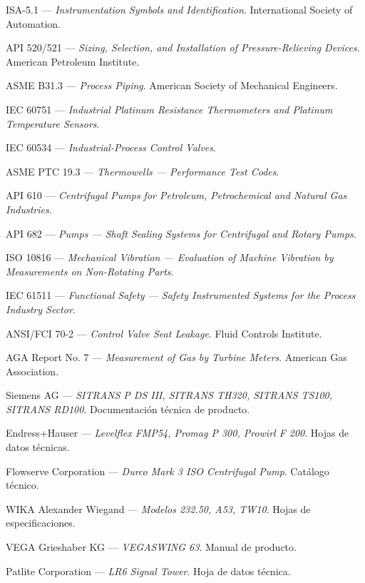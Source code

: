 \documentclass[12pt,letterpaper]{article}
\begin{document}
\begin{enumerate}[leftmargin=1.5cm, label={[\arabic*]}]
  \item ISA-5.1 — \textit{Instrumentation Symbols and Identification}. International Society of Automation.
  \item API 520/521 — \textit{Sizing, Selection, and Installation of Pressure-Relieving Devices}. American Petroleum Institute.
  \item ASME B31.3 — \textit{Process Piping}. American Society of Mechanical Engineers.
  \item IEC 60751 — \textit{Industrial Platinum Resistance Thermometers and Platinum Temperature Sensors}.
  \item IEC 60534 — \textit{Industrial-Process Control Valves}.
  \item ASME PTC 19.3 — \textit{Thermowells — Performance Test Codes}.
  \item API 610 — \textit{Centrifugal Pumps for Petroleum, Petrochemical and Natural Gas Industries}.
  \item API 682 — \textit{Pumps — Shaft Sealing Systems for Centrifugal and Rotary Pumps}.
  \item ISO 10816 — \textit{Mechanical Vibration — Evaluation of Machine Vibration by Measurements on Non-Rotating Parts}.
  \item IEC 61511 — \textit{Functional Safety — Safety Instrumented Systems for the Process Industry Sector}.
  \item ANSI/FCI 70-2 — \textit{Control Valve Seat Leakage}. Fluid Controls Institute.
  \item AGA Report No. 7 — \textit{Measurement of Gas by Turbine Meters}. American Gas Association.
  \item Siemens AG — \textit{SITRANS P DS III, SITRANS TH320, SITRANS TS100, SITRANS RD100}. Documentación técnica de producto.
  \item Endress+Hauser — \textit{Levelflex FMP54, Promag P 300, Prowirl F 200}. Hojas de datos técnicas.
  \item Flowserve Corporation — \textit{Durco Mark 3 ISO Centrifugal Pump}. Catálogo técnico.
  \item WIKA Alexander Wiegand — \textit{Modelos 232.50, A53, TW10}. Hojas de especificaciones.
  \item VEGA Grieshaber KG — \textit{VEGASWING 63}. Manual de producto.
  \item Patlite Corporation — \textit{LR6 Signal Tower}. Hoja de datos técnica.
\end{enumerate}

\end{document}
